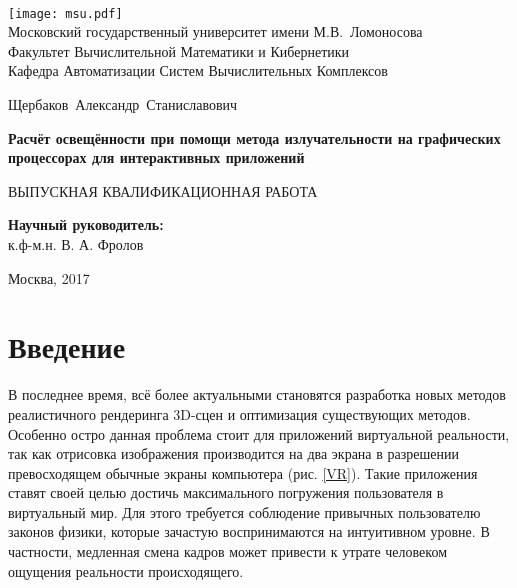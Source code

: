 \documentclass[12pt,fleqn]{article}
\begin{document}
\begin{titlepage}
\begin{center}
\ \vspace{-2cm}

    \texttt{[image: msu.pdf]}\\
    {Московский государственный университет имени М.В.~Ломоносова}\\
    Факультет Вычислительной Математики и Кибернетики\\
    Кафедра Автоматизации Систем Вычислительных Комплексов
    
    \vspace{3cm}

    {\Large Щербаков~Александр~Станиславович}

	\vspace{1cm}    
    
    {\Large\bfseries Расчёт освещённости при помощи метода излучательности на графических процессорах для интерактивных приложений\\}

	\vspace{1cm}

    {\large ВЫПУСКНАЯ КВАЛИФИКАЦИОННАЯ РАБОТА}

\end{center}

\vfill

    \begin{flushright}
            \textbf{Научный руководитель:}\\
            к.ф-м.н. В. А. Фролов
    \end{flushright}

\vfill

\begin{center}
    Москва, 2017
\end{center}

\end{titlepage}

\newpage
\renewcommand{\contentsname}{Содержание}
\tableofcontents

\newpage
\section{Введение}

В последнее время, всё более актуальными становятся разработка новых методов реалистичного рендеринга 3D-сцен и оптимизация существующих методов. Особенно остро данная проблема стоит для приложений виртуальной реальности, так как отрисовка изображения производится на два экрана в разрешении превосходящем обычные экраны компьютера (рис. \ref{VR}). Такие приложения ставят своей целью достичь максимального погружения пользователя в виртуальный мир. Для этого требуется соблюдение привычных пользователю законов физики, которые зачастую воспринимаются на интуитивном уровне. В частности, медленная смена кадров может привести к утрате человеком ощущения реальности происходящего.
\end{document}
